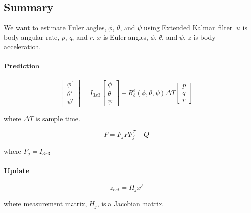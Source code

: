 \documentclass[]{article}
\begin{document}
\subsection{Summary}

We want to estimate Euler angles, $\phi$, $\theta$, and $\psi$ using Extended Kalman filter. $u$ is body angular rate, $p$, $q$, and $r$. $x$ is Euler angles, $\phi$, $\theta$, and $\psi$. $z$ is body acceleration.

\paragraph*{Prediction}

\begin{equation}
	\begin{bmatrix}
		\phi' \\
		\theta' \\
		\psi'
	\end{bmatrix} = I_{3x3} 
	\begin{bmatrix}
		\phi \\
		\theta \\
		\psi
	\end{bmatrix} + 
	R_b^e(\phi, \theta, \psi)
	\Delta T
	\begin{bmatrix}
		p \\
		q \\
		r
	\end{bmatrix}
\end{equation}

where $\Delta T$ is sample time.

\begin{equation}
	P = F_j P F_j^T + Q\label{eqn:predict_covarance_2}
\end{equation}

where $F_j = I_{3x3}$


\paragraph*{Update}


\begin{equation}
	z_{est} = H_j x'\label{eqn:predict_measurement_2}
\end{equation}

where measurement matrix, $H_j$, is a Jacobian matrix.
\end{document}
